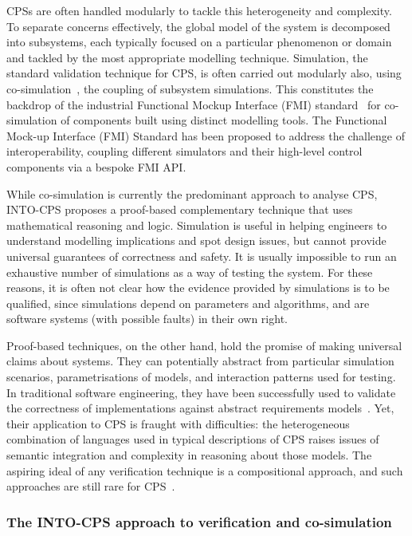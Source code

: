 CPSs are often handled modularly to tackle this heterogeneity and complexity. To separate concerns effectively, the global model of the system is decomposed into subsystems, each typically focused on a particular phenomenon or domain and tackled by the most appropriate modelling technique. Simulation, the standard validation technique for CPS, is often carried out modularly also, using co-simulation~\cite{GomesTBLV2017,GomesTBLV2018}, the coupling of subsystem simulations. This constitutes the backdrop of the industrial Functional Mockup Interface (FMI) standard~\cite{FMIStandard2014,BromanBGLMTW2013,CavalcantiWA16} for co-simulation of components built using distinct modelling tools. The Functional Mock-up Interface (FMI) Standard has been proposed to address the challenge of interoperability, coupling different simulators and their high-level control components via a bespoke FMI API.

While co-simulation is currently the predominant approach to analyse CPS, INTO-CPS proposes a proof-based complementary technique that uses mathematical reasoning and logic. Simulation is useful in helping engineers to understand modelling implications and spot design issues, but cannot provide universal guarantees of correctness and safety. It is usually impossible to run an exhaustive number of simulations as a way of testing the system. For these reasons, it is often not clear how the evidence provided by simulations is to be qualified, since simulations depend on parameters and algorithms, and are software systems (with possible faults) in their own right.

Proof-based techniques, on the other hand, hold the promise of making universal claims about systems. They can potentially abstract from particular simulation scenarios, parametrisations of models, and interaction patterns used for testing. In traditional software engineering, they have been successfully used to validate the correctness of implementations against abstract requirements models~\cite{WoodcockLBF2009}. Yet, their application to CPS is fraught with difficulties: the heterogeneous combination of languages used in typical descriptions of CPS raises issues of semantic integration and complexity in reasoning about those models. The aspiring ideal of any verification technique is a compositional approach, and such approaches are still rare for CPS~\cite{NuzzoLFS2018}.

\subsubsection{The INTO-CPS approach to verification and co-simulation}

